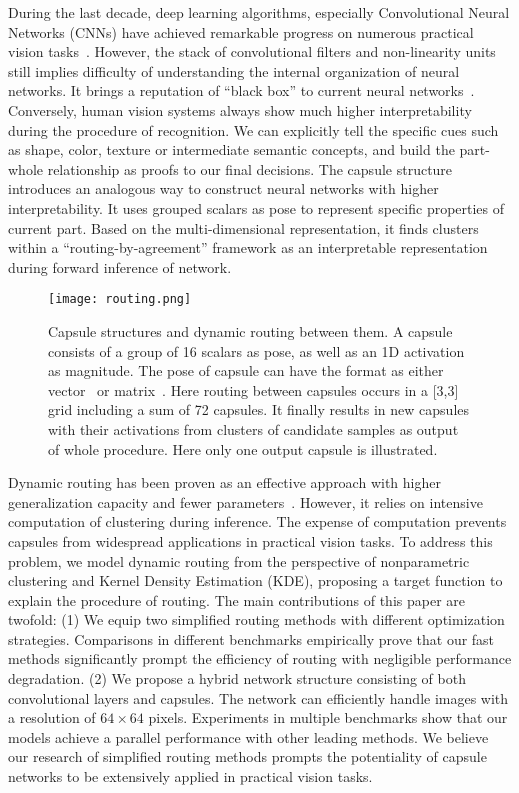 \documentclass[runningheads]{llncs}
\begin{document}
During the last decade, deep learning algorithms, especially Convolutional Neural Networks (CNNs) have achieved remarkable progress on numerous practical vision tasks~\cite{Krizhevsky2012ImageNet,karpathy2014large,lecun2015deep}. However, the stack of convolutional filters and non-linearity units still implies difficulty of understanding the internal organization of neural networks. It brings a reputation of ``black box'' to current neural networks~\cite{alain2016understanding}. Conversely, human vision systems always show much higher interpretability during the procedure of recognition. We can explicitly tell the specific cues such as shape, color, texture or intermediate semantic concepts, and build the part-whole relationship as proofs to our final decisions. The capsule structure introduces an analogous way to construct neural networks with higher interpretability. It uses grouped scalars as pose to represent specific properties of current part. Based on the multi-dimensional representation, it finds clusters within a ``routing-by-agreement'' framework as an interpretable representation during forward inference of network.
\begin{figure}
\centering
\texttt{[image: routing.png]}
\caption{Capsule structures and dynamic routing between them. A capsule consists of a group of 16 scalars as pose, as well as an 1D activation as magnitude. The pose of capsule can have the format as either vector~\cite{sabour2017dynamic} or matrix~\cite{hinton2018emrouting}. Here routing between capsules occurs in a [3,3] grid including a sum of 72 capsules. It finally results in new capsules with their activations from clusters of candidate samples as output of whole procedure. Here only one output capsule is illustrated.}
\label{fig:routing}
\end{figure}

Dynamic routing has been proven as an effective approach with higher generalization capacity and fewer parameters~\cite{hinton2018emrouting,zhaoweiemnlp2018}. However, it relies on intensive computation of clustering during inference. The expense of computation prevents capsules from widespread applications in practical vision tasks. To address this problem, we model dynamic routing from the perspective of nonparametric clustering and Kernel Density Estimation (KDE), proposing a target function to explain the procedure of routing. The main contributions of this paper are twofold: (1) We equip two simplified routing methods with different optimization strategies. Comparisons in different benchmarks empirically prove that our fast methods significantly prompt the efficiency of routing with negligible performance degradation. (2) We propose a hybrid network structure consisting of both convolutional layers and capsules. The network can efficiently handle images with a resolution of $64\times{64}$ pixels. Experiments in multiple benchmarks show that our models achieve a parallel performance with other leading methods. We believe our research of simplified routing methods prompts the potentiality of capsule networks to be extensively applied in practical vision tasks.
\end{document}
